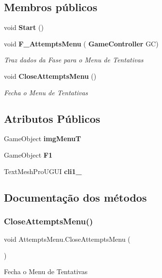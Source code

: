 \subsection*{Membros públicos}
\begin{DoxyCompactItemize}
\item 
void \textbf{ Start} ()
\item 
void \textbf{ F\+\_\+\+Attempts\+Menu} (\textbf{ Game\+Controller} GC)
\begin{DoxyCompactList}\small\item\em Traz dados da Fase para o Menu de Tentativas \end{DoxyCompactList}\item 
void \textbf{ Close\+Attempts\+Menu} ()
\begin{DoxyCompactList}\small\item\em Fecha o Menu de Tentativas \end{DoxyCompactList}\end{DoxyCompactItemize}
\subsection*{Atributos Públicos}
\begin{DoxyCompactItemize}
\item 
Game\+Object \textbf{ img\+MenuT}
\item 
Game\+Object \textbf{ F1}
\item 
Text\+Mesh\+Pro\+U\+G\+UI \textbf{ cli1\+\_}
\end{DoxyCompactItemize}


\subsection{Documentação dos métodos}
\mbox{\label{class_attempts_menu_a8b44d901a7fe1ac80a990f997512b86e}} 
\subsubsection{CloseAttemptsMenu()}
{\footnotesize\ttfamily void Attempts\+Menu.\+Close\+Attempts\+Menu (\begin{DoxyParamCaption}{ }\end{DoxyParamCaption})}



Fecha o Menu de Tentativas 

